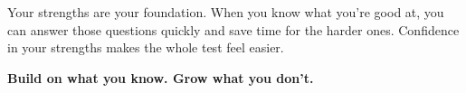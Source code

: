 {\begin{tcolorbox}[
    enhanced,
    colback=funYellowLight,
    colframe=funYellow!60,
    arc=10pt,
    boxrule=1pt,
    left=6mm, right=6mm, top=4mm, bottom=4mm,
]
\vspace{2mm}

Your strengths are your foundation. When you know what you're good at, you can answer those questions quickly and save time for the harder ones. Confidence in your strengths makes the whole test feel easier.
\end{tcolorbox}

\vspace{4mm}

\begin{center}
{\large\bfseries\color{funGreenDark} \faStar\hspace{2mm}Build on what you know. Grow what you don't.\hspace{2mm}\faStar}
\end{center}

}
\newpage
